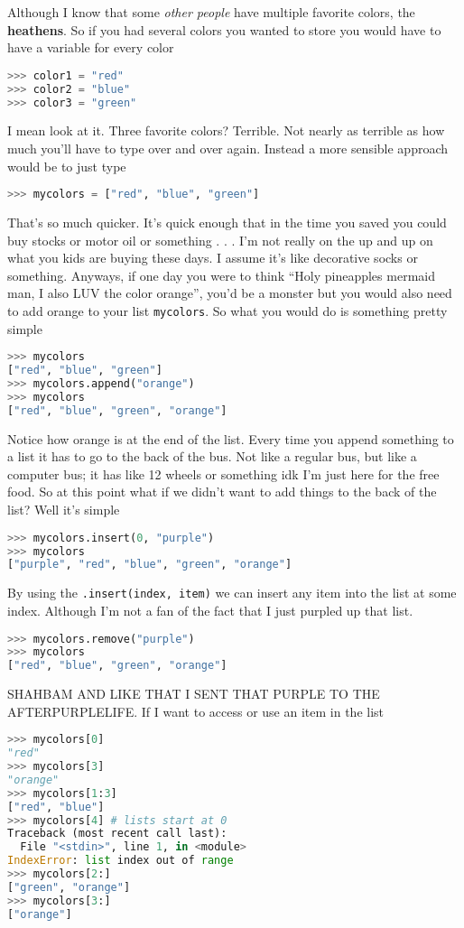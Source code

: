 \documentclass{article}
\begin{document}
Although I know that some \textit{other people} have multiple favorite colors, the \textbf{heathens}. 
So if you had several colors you wanted to store you would have to have a variable for every color 
\begin{lstlisting}[language=Python]
>>> color1 = "red"
>>> color2 = "blue"
>>> color3 = "green"
\end{lstlisting}
I mean look at it. Three favorite colors? Terrible.
Not nearly as terrible as how much you'll have to type over and over again.
Instead a more sensible approach would be to just type 
\begin{lstlisting}[language=Python]
>>> mycolors = ["red", "blue", "green"]
\end{lstlisting}
That's so much quicker. 
It's quick enough that in the time you saved you could buy stocks or motor oil or something . . . 
I'm not really on the up and up on what you kids are buying these days. I assume it's like decorative socks 
or something. 
Anyways, if one day you were to think ``Holy pineapples mermaid man, I also LUV the color orange'',
you'd be a monster but you would also need to add orange to your list \verb|mycolors|. 
So what you would do is something pretty simple 
\begin{lstlisting}[language=Python]
>>> mycolors
["red", "blue", "green"]
>>> mycolors.append("orange")
>>> mycolors
["red", "blue", "green", "orange"]
\end{lstlisting}
Notice how orange is at the end of the list. 
Every time you append something to a list it has to go to the back of the bus. 
Not like a regular bus, but like a computer bus; it has like 12 wheels or something idk 
I'm just here for the free food. 
So at this point what if we didn't want to add things to the back of the list?
Well it's simple
\begin{lstlisting}[language=Python]
>>> mycolors.insert(0, "purple")
>>> mycolors
["purple", "red", "blue", "green", "orange"]
\end{lstlisting}

By using the \verb|.insert(index, item)| we can insert any item into the list at some index.
Although I'm not a fan of the fact that I just purpled up that list. 

\begin{lstlisting}[language=Python]
>>> mycolors.remove("purple")
>>> mycolors
["red", "blue", "green", "orange"]
\end{lstlisting}

SHAHBAM AND LIKE THAT I SENT THAT PURPLE TO THE AFTERPURPLELIFE.
If I want to access or use an item in the list 
\begin{lstlisting}[language=Python]
>>> mycolors[0]
"red"
>>> mycolors[3]
"orange"
>>> mycolors[1:3]
["red", "blue"]
>>> mycolors[4] # lists start at 0
Traceback (most recent call last):
  File "<stdin>", line 1, in <module>
IndexError: list index out of range
>>> mycolors[2:]
["green", "orange"]
>>> mycolors[3:]
["orange"]
\end{lstlisting}
\end{document}
